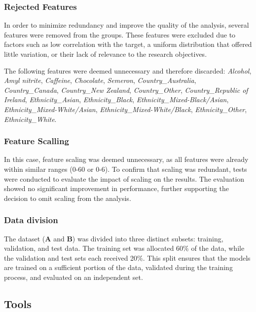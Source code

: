 \documentclass{article}
\begin{document}
\newpage

\subsubsection{Rejected Features}
\hspace{1cm}In order to minimize redundancy and improve the quality of the analysis, several features were removed from the groups. These features were excluded due to factors such as low correlation with the target, a uniform distribution that offered little variation, or their lack of relevance to the research objectives.

 
The following features were deemed unnecessary and therefore discarded:
\textit{Alcohol}, \textit{Amyl nitrite}, \textit{Caffeine}, \textit{Chocolate}, \textit{Semeron}, \textit{Country\_Australia}, \textit{Country\_Canada}, \textit{Country\_New Zealand}, \textit{Country\_Other}, \textit{Country\_Republic of Ireland}, \textit{Ethnicity\_Asian}, \textit{Ethnicity\_Black},
\textit{Ethnicity\_Mixed-Black/Asian}, \textit{Ethnicity\_Mixed-White/Asian},
\textit{Ethnicity\_Mixed-White/Black},
\textit{Ethnicity\_Other}, \textit{Ethnicity\_White}.

\subsubsection{Feature Scalling}
\hspace{1cm}In this case, feature scaling was deemed unnecessary, as all features were already within similar ranges (0-60 or 0-6). To confirm that scaling was redundant, tests were conducted to evaluate the impact of scaling on the results. The evaluation showed no significant improvement in performance, further supporting the decision to omit scaling from the analysis.

\subsubsection{Data division}
\hspace{1cm}The dataset (\textbf{A} and \textbf{B}) was divided into three distinct subsets: training, validation, and test data. The training set was allocated 60\% of the data, while the validation and test sets each received 20\%. This split ensures that the models are trained on a sufficient portion of the data, validated during the training process, and evaluated on an independent set.

\subsection{Tools}
\end{document}
